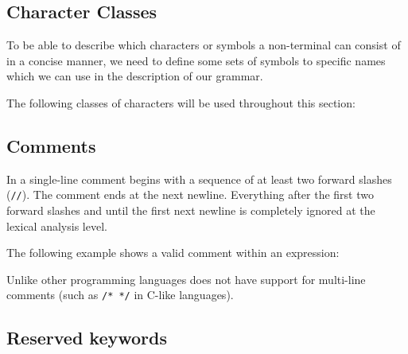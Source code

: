 \subsection{Character Classes}
To be able to describe which characters or symbols a non-terminal can consist of in a concise manner, we need to define some sets of symbols to specific names which we can use in the description of our grammar.

The following classes of characters will be used throughout this section:

\begin{ebnf}
\end{ebnf}

\subsection{Comments}

In \productname{} a single-line comment begins with a sequence of at least two forward slashes (\texttt{//}).
The comment ends at the next newline. Everything after the first two forward slashes and until the first next
newline is completely ignored at the lexical analysis level.

The following example shows a valid comment within an expression:


Unlike other programming languages \productname{} does not have support for multi-line comments (such as
\texttt{/* */} in C-like languages).

\subsection{Reserved keywords}

\begin{ebnf}
\end{ebnf}

